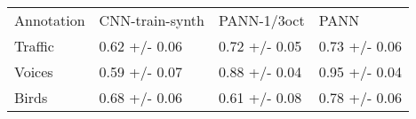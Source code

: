 \begin{tabular}{llll}
Annotation & CNN-train-synth & PANN-1/3oct & PANN \\
Traffic & 0.62 +/- 0.06 & 0.72 +/- 0.05 & 0.73 +/- 0.06 \\
Voices & 0.59 +/- 0.07 & 0.88 +/- 0.04 & 0.95 +/- 0.04 \\
Birds & 0.68 +/- 0.06 & 0.61 +/- 0.08 & 0.78 +/- 0.06 \\
\end{tabular}
